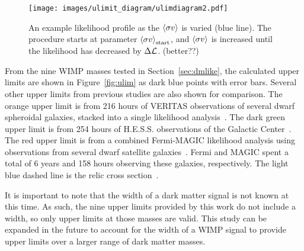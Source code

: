 %
%
%
%

\begin{figure}[bt]
  \centering
  \texttt{[image: images/ulimit\_diagram/ulimdiagram2.pdf]}
  \caption[Upper Limit Calculation]{
    An example likelihood profile as the $\left \langle \sigma v \right \rangle$ is varied (blue line).
    The procedure starts at parameter $\left \langle \sigma v \right \rangle_{\mathrm{start}}$, and $\left \langle \sigma v \right \rangle$ is increased until the likelihood has decreased by $\Delta{}\mathcal{L}$.
    {\color{red}(better??)}
  }
  \label{fig:ulimitdiag}
\end{figure}



From the nine WIMP masses tested in Section~\ref{sec:dmlike}, the calculated upper limits are shown in Figure~\ref{fig:ulim} as dark blue points with error bars.
Several other upper limits from previous studies are also shown for comparison.
The orange upper limit is from 216 hours of VERITAS observations of several dwarf spheroidal galaxies, stacked into a single likelihood analysis~\cite{verdsphul}.
The dark green upper limit is from 254 hours of H.E.S.S. observations of the Galactic Center~\cite{hessgcul}.
The red upper limit is from a combined Fermi-MAGIC likelihood analysis using observations from several dwarf satellite galaxies~\cite{fermagicul}.
Fermi and MAGIC spent a total of 6 years and 158 hours observing these galaxies, respectively.
The light blue dashed line is the relic cross section~\cite{updatedWIMPRelicCrossSection}.

It is important to note that the width of a dark matter signal is not known at this time.
As such, the nine upper limits provided by this work do not include a width, so only upper limits at those masses are valid.
This study can be expanded in the future to account for the width of a WIMP signal to provide upper limits over a larger range of dark matter masses.

